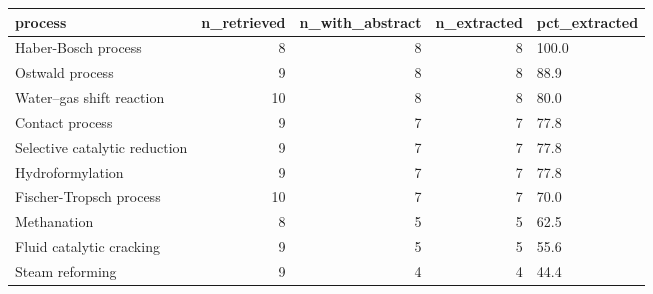 \begin{tabular}{lrrrl}
\toprule
process & n\_retrieved & n\_with\_abstract & n\_extracted & pct\_extracted \\
\midrule
Haber-Bosch process & 8 & 8 & 8 & 100.0 \\
Ostwald process & 9 & 8 & 8 & 88.9 \\
Water–gas shift reaction & 10 & 8 & 8 & 80.0 \\
Contact process & 9 & 7 & 7 & 77.8 \\
Selective catalytic reduction & 9 & 7 & 7 & 77.8 \\
Hydroformylation & 9 & 7 & 7 & 77.8 \\
Fischer-Tropsch process & 10 & 7 & 7 & 70.0 \\
Methanation & 8 & 5 & 5 & 62.5 \\
Fluid catalytic cracking & 9 & 5 & 5 & 55.6 \\
Steam reforming & 9 & 4 & 4 & 44.4 \\
\bottomrule
\end{tabular}
